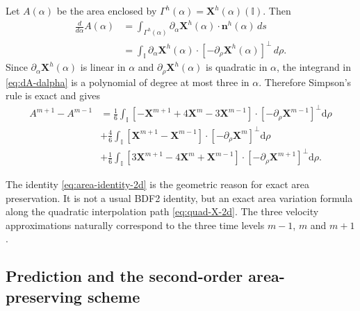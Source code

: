 \documentclass[smallextended]{svjour3}
\numberwithin{equation}{section}
\begin{document}
	Let $A(\alpha)$ be the area enclosed by $\Gamma^h(\alpha)=\mathbf{X}^h(\alpha)(\mathbb{I})$. Then
	\begin{equation}
		\begin{aligned}
			\frac{d}{d\alpha}A(\alpha)
			&=
			\int_{\Gamma^h(\alpha)}
			\partial_\alpha\mathbf{X}^h(\alpha)\cdot \mathbf{n}^h(\alpha)\,ds
			\\
			&=
			\int_{\mathbb{I}}
			\partial_\alpha\mathbf{X}^h(\alpha)\cdot
			\left[-\partial_\rho\mathbf{X}^h(\alpha)\right]^\perp\,d\rho.
		\end{aligned}
		\label{eq:dA-dalpha}
	\end{equation}
	Since $\partial_\alpha\mathbf{X}^h(\alpha)$ is linear in $\alpha$ and $\partial_\rho\mathbf{X}^h(\alpha)$ is quadratic in $\alpha$, the integrand in \eqref{eq:dA-dalpha} is a polynomial of degree at most three in $\alpha$. Therefore Simpson's rule is exact and gives
	\begin{equation}
		\begin{aligned}
			A^{m+1}-A^{m-1}
			& = \frac{1}{6}\int_{\mathbb{I}}\left[-\mathbf{X}^{m+1}+4\mathbf{X}^m-3\mathbf{X}^{m-1}\right] \cdot\left[-\partial_\rho \mathbf{X}^{m-1}\right]^{\perp} \mathrm{d} \rho  \\ 
			& + \frac{4}{6}\int_{\mathbb{I}}\left[\mathbf{X}^{m+1}-\mathbf{X}^{m-1}\right] \cdot\left[-\partial_\rho \mathbf{X}^m\right]^{\perp} \mathrm{d} \rho \\
			& + \frac{1}{6}\int_{\mathbb{I}}\left[3\mathbf{X}^{m+1}-4\mathbf{X}^m+\mathbf{X}^{m-1}\right] \cdot\left[-\partial_\rho \mathbf{X}^{m+1}\right]^{\perp} \mathrm{d} \rho .
		\end{aligned}
		\label{eq:area-identity-2d}
	\end{equation}
	
	\begin{remark}
		The identity \eqref{eq:area-identity-2d} is the geometric reason for exact area preservation. It is not a usual BDF2 identity, but an exact area variation formula along the quadratic interpolation path \eqref{eq:quad-X-2d}. The three velocity approximations naturally correspond to the three time levels $m-1$, $m$ and $m+1$. 
	\end{remark}
	
	\subsection{Prediction and the second-order area-preserving scheme}
	
\end{document}
